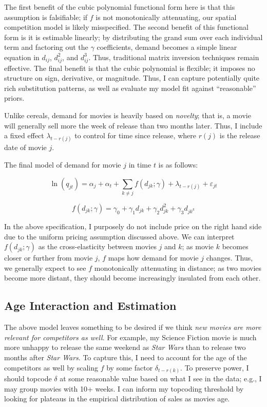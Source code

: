 \documentclass{article}
\begin{document}
The first benefit of the cubic polynomial functional form here is that this assumption is falsifiable; if $f$ is not monotonically attenuating, our spatial competition model is likely misspecified. The second benefit of this functional form is it is estimable linearly; by distributing the grand sum over each individual term and factoring out the $\gamma$ coefficients, demand becomes a simple linear equation in $d_{ij}$, $d_{ij}^2$, and $d_{ij}^3$. Thus, traditional matrix inversion techniques remain effective. The final benefit is that the cubic polynomial is flexible; it imposes no structure on sign, derivative, or magnitude. Thus, I can capture potentially quite rich substitution patterns, as well as evaluate my model fit against ``reasonable'' priors. 

Unlike cereals, demand for movies is heavily based on \emph{novelty}; that is, a movie will generally sell more the week of release than two months later. Thus, I include a fixed effect $\lambda_{t - r(j)}$ to control for time since release, where $r(j)$ is the release date of movie $j$. 

The final model of demand for movie $j$ in time $t$ is as follows:

$$\ln(q_{jt}) = \alpha_j + \alpha_t + \sum_{k \neq j} f(d_{jk}; \gamma) + \lambda_{t - r(j)} + \varepsilon_{jt}$$

$$f(d_{jk}; \gamma) = \gamma_0 + \gamma_1 d_{jk} + \gamma_2 d_{jk}^2 + \gamma_3 d_{jk^k}$$

In the above specification, I purposely do not include price on the right hand side due to the uniform pricing assumption discussed above. We can interpret $f(d_{jk}; \gamma)$ as the cross-elasticity between movies $j$ and $k$; as movie $k$ becomes closer or further from movie $j$, $f$ maps how demand for movie $j$ changes. Thus, we generally expect to see $f$ monotonically attenuating in distance; as two movies become more distant, they should become increasingly insulated from each other.


\subsection{Age Interaction and Estimation}

The above model leaves something to be desired if we think \emph{new movies are more relevant for competitors as well}. For example, my Science Fiction movie is much more unhappy to release the same weekend as \emph{Star Wars} than to release two months after \emph{Star Wars}. To capture this, I need to account for the age of the competitors as well by scaling $f$ by some factor $\delta_{t - r(k)}$. To preserve power, I should topcode $\delta$ at some reasonable value based on what I see in the data; e.g., I may group movies with 10+ weeks. I can inform my topcoding threshold by looking for plateaus in the empirical distribution of sales as movies age.
\end{document}
